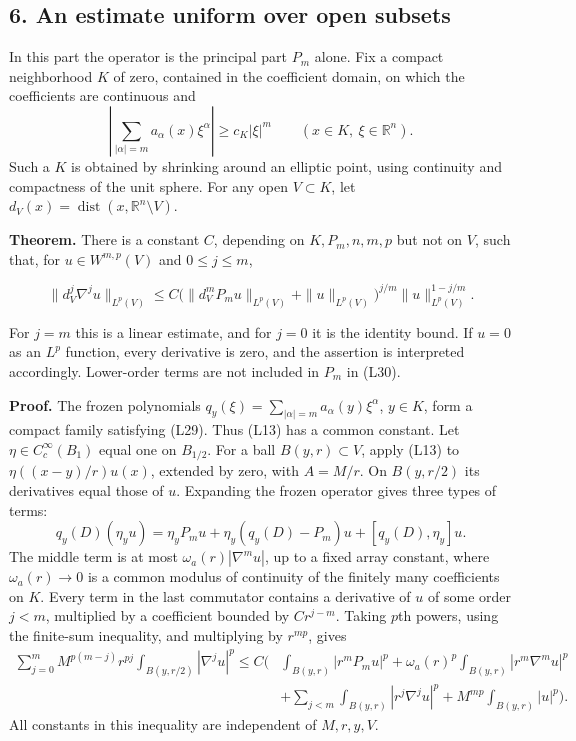 \documentclass[
  11pt,
]{article}
\begin{document}
\subsection{6. An estimate uniform over open
subsets}\label{an-estimate-uniform-over-open-subsets}

In this part the operator is the principal part \(P_m\) alone. Fix a
compact neighborhood \(K\) of zero, contained in the coefficient domain,
on which the coefficients are continuous and \[
\left|\sum_{|\alpha|=m}a_\alpha(x)\xi^\alpha\right|
\geq c_K|\xi|^m\qquad(x\in K,\ \xi\in\mathbb R^n).                \tag{L29}
\] Such a \(K\) is obtained by shrinking around an elliptic point, using
continuity and compactness of the unit sphere. For any open
\(V\subset K\), let
\(d_V(x)=\operatorname{dist}(x,\mathbb R^n\setminus V)\).

\textbf{Theorem.} There is a constant \(C\), depending on
\(K,P_m,n,m,p\) but not on \(V\), such that, for \(u\in W^{m,p}(V)\) and
\(0\leq j\leq m\),

\[
\|d_V^j\nabla^j u\|_{L^p(V)}
\leq C\bigl(\|d_V^mP_mu\|_{L^p(V)}+\|u\|_{L^p(V)}\bigr)^{j/m}
        \|u\|_{L^p(V)}^{1-j/m}.                                  \tag{L30}
\]

For \(j=m\) this is a linear estimate, and for \(j=0\) it is the
identity bound. If \(u=0\) as an \(L^p\) function, every derivative is
zero, and the assertion is interpreted accordingly. Lower-order terms
are not included in \(P_m\) in (L30).

\textbf{Proof.} The frozen polynomials
\(q_y(\xi)=\sum_{|\alpha|=m}a_\alpha(y)\xi^\alpha\), \(y\in K\), form a
compact family satisfying (L29). Thus (L13) has a common constant. Let
\(\eta\in C_c^\infty(B_1)\) equal one on \(B_{1/2}\). For a ball
\(B(y,r)\subset V\), apply (L13) to \(\eta((x-y)/r)u(x)\), extended by
zero, with \(A=M/r\). On \(B(y,r/2)\) its derivatives equal those of
\(u\). Expanding the frozen operator gives three types of terms: \[
q_y(D)(\eta_yu)=\eta_yP_mu+\eta_y(q_y(D)-P_m)u+[q_y(D),\eta_y]u.
\] The middle term is at most \(\omega_a(r)|\nabla^m u|\), up to a fixed
array constant, where \(\omega_a(r)\to0\) is a common modulus of
continuity of the finitely many coefficients on \(K\). Every term in the
last commutator contains a derivative of \(u\) of some order \(j<m\),
multiplied by a coefficient bounded by \(Cr^{j-m}\). Taking \(p\)th
powers, using the finite-sum inequality, and multiplying by \(r^{mp}\),
gives \[
\begin{split}
\sum_{j=0}^m M^{p(m-j)}r^{pj}
       \int_{B(y,r/2)}|\nabla^j u|^p
\leq C\bigg(&\int_{B(y,r)}|r^mP_mu|^p
 +\omega_a(r)^p\int_{B(y,r)}|r^m\nabla^m u|^p\\
 &+\sum_{j<m}\int_{B(y,r)}|r^j\nabla^j u|^p
 +M^{mp}\int_{B(y,r)}|u|^p\bigg).
\end{split}                                                       \tag{L31}
\] All constants in this inequality are independent of \(M,r,y,V\).
\end{document}
